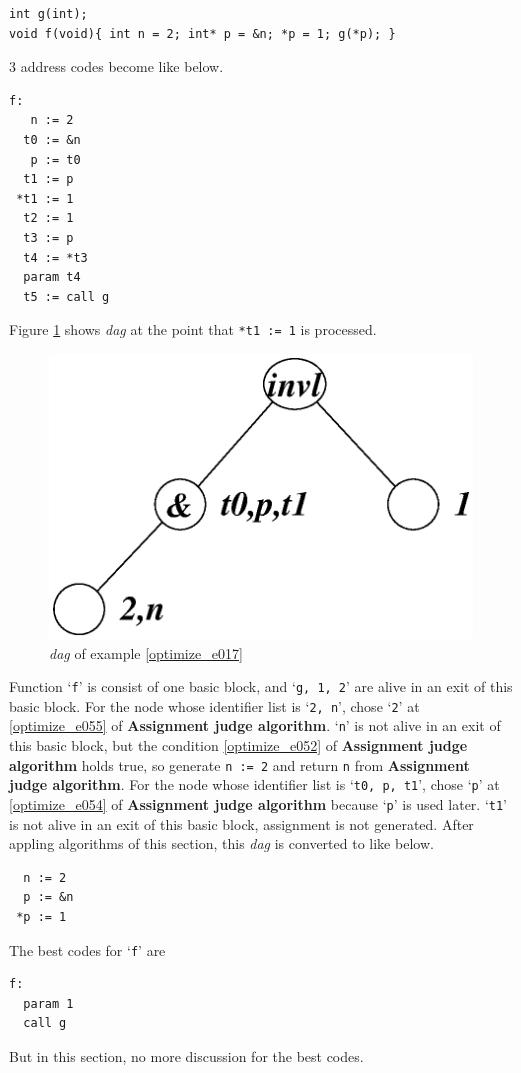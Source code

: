 \begin{Example}
\begin{verbatim}
int g(int);
void f(void){ int n = 2; int* p = &n; *p = 1; g(*p); }
\end{verbatim}
3 address codes become like below.
\begin{verbatim}
f:
   n := 2
  t0 := &n
   p := t0
  t1 := p
 *t1 := 1
  t2 := 1
  t3 := p
  t4 := *t3
  param t4
  t5 := call g
\end{verbatim}
Figure \ref{optimize_e018} shows {\em dag} at the point that
{\tt{*t1 := 1}} is processed.
\begin{figure}[htbp]
\begin{center}
\includegraphics[width=0.8\linewidth,height=0.525\linewidth]{opt007.eps}
\caption{{\em dag} of example \ref{optimize_e017}}
\label{optimize_e018}
\end{center}
\end{figure}
Function `{\tt{f}}' is consist of one basic block, and 
`{\tt{g, 1, 2}}' are alive in an exit of this basic block.
For the node whose identifier list is `{\tt{2, n}}',
chose `{\tt{2}}' at \ref{optimize_e055} of {\bf Assignment judge algorithm}.
`{\tt{n}}' is not alive in an exit of this basic block, but
the condition \ref{optimize_e052} of {\bf Assignment judge algorithm}
holds true, so generate {\tt{n := 2}} and return {\tt{n}} from
{\bf Assignment judge algorithm}.
For the node whose identifier list is `{\tt{t0, p, t1}}',
chose `{\tt{p}}' at \ref{optimize_e054} of {\bf Assignment judge
 algorithm} because `{\tt{p}}' is used later.
 `{\tt{t1}}' is not alive in an exit of this basic block,
assignment is not generated.
After appling algorithms of this section,
this {\em dag} is converted to like below.
\begin{verbatim}
  n := 2
  p := &n
 *p := 1
\end{verbatim}
The best codes for `{\tt{f}}' are
\begin{verbatim}
f:
  param 1
  call g
\end{verbatim}
But in this section, no more discussion for the best codes.
\end{Example}

